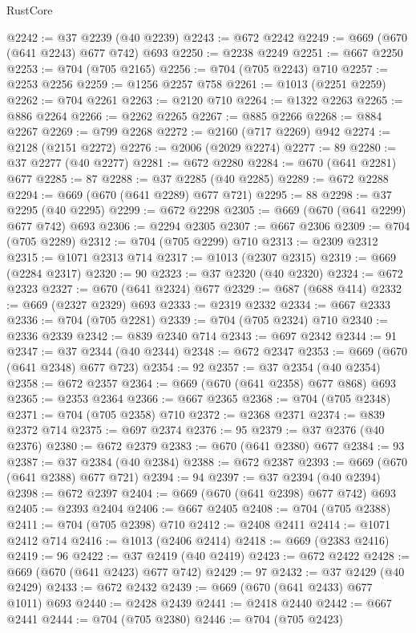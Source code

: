 \begin{lexlean}{RustCore}
\begin{coremodule}
@2242 := @37 @2239 (@40 @2239)
@2243 := @672 @2242
@2249 := @669 (@670 (@641 @2243) @677 @742) @693
@2250 := @2238 @2249
@2251 := @667 @2250
@2253 := @704 (@705 @2165)
@2256 := @704 (@705 @2243) @710
@2257 := @2253 @2256
@2259 := @1256 @2257 @758
@2261 := @1013 (@2251 @2259)
@2262 := @704 @2261
@2263 := @2120 @710
@2264 := @1322 @2263
@2265 := @886 @2264
@2266 := @2262 @2265
@2267 := @885 @2266
@2268 := @884 @2267
@2269 := @799 @2268
@2272 := @2160 (@717 @2269) @942
@2274 := @2128 (@2151 @2272)
@2276 := @2006 (@2029 @2274)
@2277 := 89
@2280 := @37 @2277 (@40 @2277)
@2281 := @672 @2280
@2284 := @670 (@641 @2281) @677
@2285 := 87
@2288 := @37 @2285 (@40 @2285)
@2289 := @672 @2288
@2294 := @669 (@670 (@641 @2289) @677 @721)
@2295 := 88
@2298 := @37 @2295 (@40 @2295)
@2299 := @672 @2298
@2305 := @669 (@670 (@641 @2299) @677 @742) @693
@2306 := @2294 @2305
@2307 := @667 @2306
@2309 := @704 (@705 @2289)
@2312 := @704 (@705 @2299) @710
@2313 := @2309 @2312
@2315 := @1071 @2313 @714
@2317 := @1013 (@2307 @2315)
@2319 := @669 (@2284 @2317)
@2320 := 90
@2323 := @37 @2320 (@40 @2320)
@2324 := @672 @2323
@2327 := @670 (@641 @2324) @677
@2329 := @687 (@688 @414)
@2332 := @669 (@2327 @2329) @693
@2333 := @2319 @2332
@2334 := @667 @2333
@2336 := @704 (@705 @2281)
@2339 := @704 (@705 @2324) @710
@2340 := @2336 @2339
@2342 := @839 @2340 @714
@2343 := @697 @2342
@2344 := 91
@2347 := @37 @2344 (@40 @2344)
@2348 := @672 @2347
@2353 := @669 (@670 (@641 @2348) @677 @723)
@2354 := 92
@2357 := @37 @2354 (@40 @2354)
@2358 := @672 @2357
@2364 := @669 (@670 (@641 @2358) @677 @868) @693
@2365 := @2353 @2364
@2366 := @667 @2365
@2368 := @704 (@705 @2348)
@2371 := @704 (@705 @2358) @710
@2372 := @2368 @2371
@2374 := @839 @2372 @714
@2375 := @697 @2374
@2376 := 95
@2379 := @37 @2376 (@40 @2376)
@2380 := @672 @2379
@2383 := @670 (@641 @2380) @677
@2384 := 93
@2387 := @37 @2384 (@40 @2384)
@2388 := @672 @2387
@2393 := @669 (@670 (@641 @2388) @677 @721)
@2394 := 94
@2397 := @37 @2394 (@40 @2394)
@2398 := @672 @2397
@2404 := @669 (@670 (@641 @2398) @677 @742) @693
@2405 := @2393 @2404
@2406 := @667 @2405
@2408 := @704 (@705 @2388)
@2411 := @704 (@705 @2398) @710
@2412 := @2408 @2411
@2414 := @1071 @2412 @714
@2416 := @1013 (@2406 @2414)
@2418 := @669 (@2383 @2416)
@2419 := 96
@2422 := @37 @2419 (@40 @2419)
@2423 := @672 @2422
@2428 := @669 (@670 (@641 @2423) @677 @742)
@2429 := 97
@2432 := @37 @2429 (@40 @2429)
@2433 := @672 @2432
@2439 := @669 (@670 (@641 @2433) @677 @1011) @693
@2440 := @2428 @2439
@2441 := @2418 @2440
@2442 := @667 @2441
@2444 := @704 (@705 @2380)
@2446 := @704 (@705 @2423)

\end{coremodule}
\end{lexlean}
